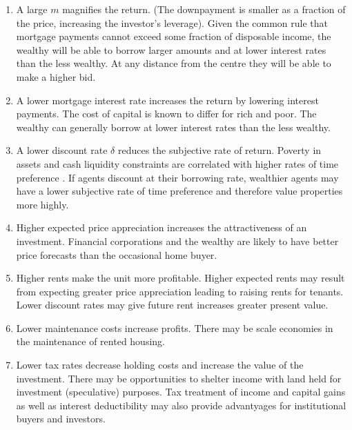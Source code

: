 \begin{enumerate}
\item A large $m$ magnifies the return. (The downpayment is smaller as a fraction of the price, increasing the investor's leverage). 
Given the  common rule that mortgage payments cannot exceed some fraction of disposable income, the wealthy will be able to borrow larger amounts and at lower interest rates than the less wealthy. At any distance from the centre they will be able to make a higher bid.

\item A lower mortgage interest rate increases the return by lowering interest payments. The cost of capital is known to differ for rich and poor.  The wealthy can generally borrow  at lower interest rates than the less wealthy. 

\item A lower discount rate $\delta$ reduces the subjective rate of return.  Poverty in assets and cash liquidity constraints are correlated with higher rates of time preference  \cite{carvalhoPovertyTimePreference2010}\cite{holdenPovertyMarketImperfections1998}. If agents discount at their borrowing rate, wealthier agents may have a lower subjective rate of time preference and therefore value properties more highly. 

\item Higher expected price appreciation increases the attractiveness of an investment. Financial corporations and the wealthy are likely to have better price forecasts than  the occasional home buyer.
\item Higher rents make the unit more profitable. Higher expected  rents may result from expecting greater price appreciation  leading to raising rents for tenants. Lower discount rates may give future rent increases greater present value.
\item Lower maintenance costs increase profits. There may be scale economies in the maintenance  of rented housing. 
\item Lower tax rates decrease holding costs and increase the value of the investment. There may be opportunities to shelter income with land held for investment (speculative) purposes. Tax treatment of income and capital gains as well as interest deductibility may also provide advantyages for institutional buyers and investors.%


\end{enumerate}
